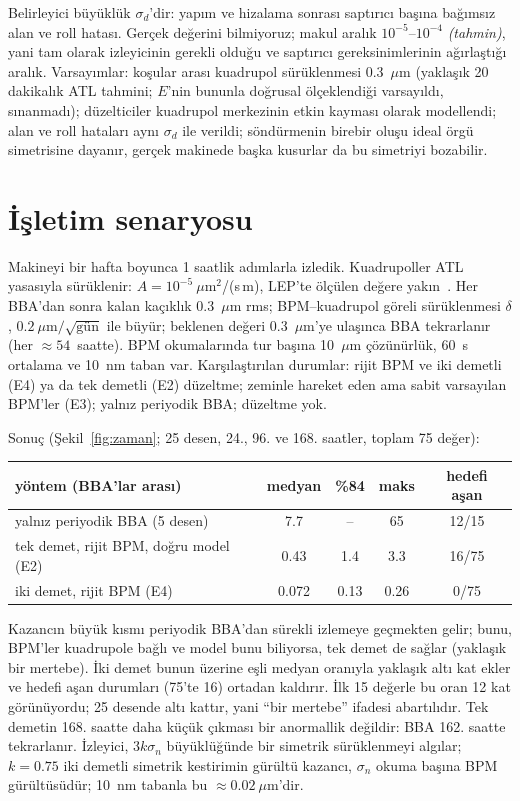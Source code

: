 \documentclass[12pt,a4paper]{extarticle}
\newcommand{\tahmin}{\textit{(tahmin)}}
\begin{document}
Belirleyici büyüklük $\sigma_d$'dir: yapım ve hizalama sonrası saptırıcı başına bağımsız alan ve roll hatası.
Gerçek değerini bilmiyoruz; makul aralık $10^{-5}$--$10^{-4}$ \tahmin, yani tam olarak izleyicinin gerekli olduğu
ve saptırıcı gereksinimlerinin ağırlaştığı aralık. Varsayımlar: koşular arası kuadrupol sürüklenmesi 0.3~$\mu$m
(yaklaşık 20 dakikalık ATL tahmini; $E$'nin bununla doğrusal ölçeklendiği varsayıldı, sınanmadı);
düzelticiler kuadrupol merkezinin etkin kayması olarak modellendi; alan ve roll hataları aynı $\sigma_d$ ile
verildi; söndürmenin birebir oluşu ideal örgü simetrisine dayanır, gerçek makinede başka kusurlar da bu
simetriyi bozabilir.

\section{İşletim senaryosu}\label{sec:zaman}
Makineyi bir hafta boyunca 1 saatlik adımlarla izledik. Kuadrupoller ATL yasasıyla sürüklenir:
$A=10^{-5}~\mu$m$^2$/(s\,m), LEP'te ölçülen değere yakın~\cite{shiltsev}. Her BBA'dan sonra kalan kaçıklık
0.3~$\mu$m rms; BPM--kuadrupol göreli sürüklenmesi $\delta$, $0.2~\mu$m$/\sqrt{\text{gün}}$ ile büyür; beklenen
değeri 0.3~$\mu$m'ye ulaşınca BBA tekrarlanır (her $\approx54$~saatte). BPM okumalarında tur başına 10~$\mu$m
çözünürlük, 60~s ortalama ve 10~nm taban var. Karşılaştırılan durumlar: rijit BPM ve iki demetli (E4) ya da tek
demetli (E2) düzeltme; zeminle hareket eden ama sabit varsayılan BPM'ler (E3); yalnız periyodik BBA; düzeltme yok.

Sonuç (Şekil~\ref{fig:zaman}; 25 desen, 24., 96. ve 168. saatler, toplam 75 değer):
\begin{center}\footnotesize
\begin{tabular}{lcccc}\toprule
yöntem (BBA'lar arası) & medyan & \%84 & maks & hedefi aşan\\\midrule
yalnız periyodik BBA (5 desen) & 7.7 & -- & 65 & 12/15\\
tek demet, rijit BPM, doğru model (E2) & 0.43 & 1.4 & 3.3 & 16/75\\
iki demet, rijit BPM (E4) & 0.072 & 0.13 & 0.26 & 0/75\\\bottomrule
\end{tabular}\end{center}
Kazancın büyük kısmı periyodik BBA'dan sürekli izlemeye geçmekten gelir; bunu, BPM'ler kuadrupole bağlı ve
model bunu biliyorsa, tek demet de sağlar (yaklaşık bir mertebe). İki demet bunun üzerine eşli medyan oranıyla
yaklaşık altı kat ekler ve hedefi aşan durumları (75'te 16) ortadan kaldırır. İlk 15 değerle bu oran 12 kat
görünüyordu; 25 desende altı kattır, yani ``bir mertebe'' ifadesi abartılıdır. Tek demetin 168. saatte daha
küçük çıkması bir anormallik değildir: BBA 162. saatte tekrarlanır. İzleyici, $3k\sigma_n$ büyüklüğünde bir
simetrik sürüklenmeyi algılar; $k=0.75$ iki demetli simetrik kestirimin gürültü kazancı, $\sigma_n$ okuma başına
BPM gürültüsüdür; 10~nm tabanla bu $\approx0.02~\mu$m'dir.
\end{document}
